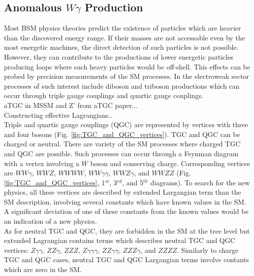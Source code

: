 \subsection{Anomalous $W\gamma$ Production}
\label{sec:WgAbout_ATGC}

Most BSM physics theories predict the existence of particles which are heavier than the discovered energy range. If their masses are not accessable even by the most energetic machines, the direct detection of such particles is not possible. However, they can contribute to the productions of lower energetic particles producing loops where such heavy particles would be off-shell. This effects can be probed by precision measurements of the SM processes. In the electroweak sector processes of such interest include diboson and triboson productions which can occur through triple gauge couplings and quartic gauge couplings.\\

aTGC in MSSM and Z' from aTGC paper...\\

Constructing effective Lagrangians..\\

Triple and quartic gauge couplings (QGC) are represented by vertices with three and four bosons (Fig. \ref{fig:TGC_and_QGC_vertices}). TGC and QGC can be charged or neutral. There are variety of the SM processes where charged TGC and QGC are possible. Such processes can occur through a Feynman diagram with a vertex involving a $W$ boson and conserving charge. Corresponding vertices are $WW\gamma$, $WWZ$, $WWWW$, $WW\gamma\gamma$, $WWZ\gamma$, and $WWZZ$ (Fig. \ref{fig:TGC_and_QGC_vertices}, 1$^{st}$, 3$^{rd}$, and 5$^{th}$ diagrams). 
To search for the new physics, all these vertices are described by extended Largangian term than the SM description, involving several constants which have known values in the SM. A significant deviation of one of these constants from the known values would be an indication of a new physics.\\

As for neutral TGC and QGC, they are forbidden in the SM at the tree level but extended Lagrangian contains terms which describes neutral TGC and QGC vertices: $Z\gamma\gamma$, $ZZ\gamma$, $ZZZ$, $Z\gamma\gamma\gamma$, $ZZ\gamma\gamma$, $ZZZ\gamma$, and $ZZZZ$. Similarly to charge TGC and QGC cases, neutral TGC and QGC Largangian terms involve contants which are zero in the SM.\\  

